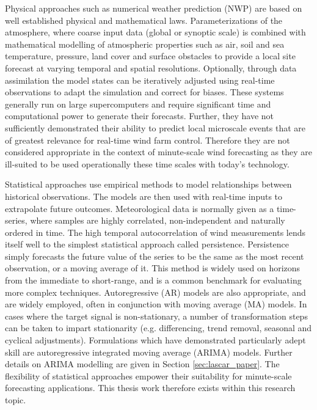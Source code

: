Physical approaches such as numerical weather prediction (NWP) are based on well established physical and mathematical laws. Parameterizations of the atmosphere, where coarse input data (global or synoptic scale) is combined with mathematical modelling of atmospheric properties such as air, soil and sea temperature, pressure, land cover and surface obstacles to provide a local site forecast at varying temporal and spatial resolutions. Optionally, through data assimilation the model states can be iteratively adjusted using real-time observations to adapt the simulation and correct for biases. These systems generally run on large supercomputers and require significant time and computational power to generate their forecasts. Further, they have not sufficiently demonstrated their ability to predict local microscale events that are of greatest relevance for real-time wind farm control. Therefore they are not considered appropriate in the context of minute-scale wind forecasting as they are ill-suited to be used operationally these time scales with today's technology.

Statistical approaches use empirical methods to model relationships between historical observations. The models are then used with real-time inputs to extrapolate future outcomes. Meteorological data is normally given as a time-series, where samples are highly correlated, non-independent and naturally ordered in time. The high temporal autocorrelation of wind measurements lends itself well to the simplest statistical approach called persistence. Persistence simply forecasts the future value of the series to be the same as the most recent observation, or a moving average of it. This method is widely used on horizons from the immediate to short-range, and is a common benchmark for evaluating more complex techniques. Autoregressive (AR) models are also appropriate, and are widely employed, often in conjunction with moving average (MA) models. In cases where the target signal is non-stationary, a number of transformation steps can be taken to impart stationarity (e.g. differencing, trend removal, seasonal and cyclical adjustments). Formulations which have demonstrated particularly adept skill are autoregressive integrated moving average (ARIMA) models. Further details on ARIMA modelling are given in Section \ref{sec:lascar_paper}. The flexibility of statistical approaches empower their suitability for minute-scale forecasting applications. This thesis work therefore exists within this research topic.

